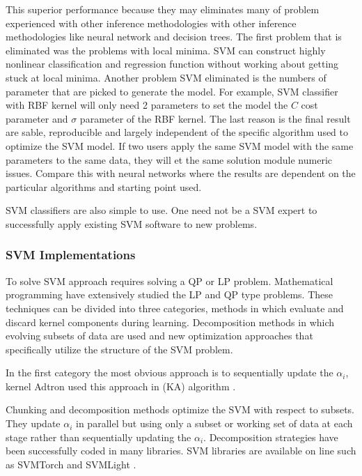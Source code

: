 This superior performance because they may eliminates many of problem experienced with other inference methodologies with other inference methodologies like neural network and decision trees. The first problem that is eliminated was the problems with local minima. SVM can construct highly nonlinear classification and regression function without working about getting stuck at local minima. Another problem SVM eliminated is the numbers of parameter that are picked to generate the model. For example, SVM classifier with RBF kernel will only need 2 parameters to set the model the $C$ cost parameter and $\sigma$ parameter of the RBF kernel. The last reason is the final result are sable, reproducible and largely independent of the specific algorithm used to  optimize the SVM model. If two users apply the same SVM model with the same parameters to the same data, they will et the same solution module numeric issues. Compare this with neural networks where the results are dependent on the particular algorithms and starting point used. 

SVM classifiers are also simple to use. One need not be a SVM expert to successfully apply existing SVM software to new problems. 



\subsubsection {SVM Implementations}
To solve SVM approach requires solving a QP or LP problem.  Mathematical programming have extensively studied the LP and QP type problems. These techniques can be divided into three categories, methods in which evaluate and discard kernel components during learning. Decomposition methods in which evolving subsets of data are used and new optimization approaches that specifically utilize the structure of the SVM problem. 

In the first category the most obvious approach is to sequentially update the $\alpha_i$,  kernel Adtron  used this approach in (KA) algorithm \cite{kernelSVM4}. 

Chunking and decomposition methods optimize the SVM with respect to subsets. They update $\alpha_i$ in parallel but using only a subset or working set of data at each stage rather than sequentially updating the $\alpha_i$. Decomposition strategies have been successfully coded in many libraries. SVM libraries are available on line such as SVMTorch \cite{svmTorch} and SVMLight \cite{SVMlight}. 


